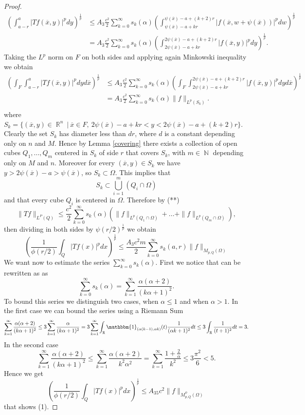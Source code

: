 \documentclass[12pt]{article}
\theoremstyle{definition}
\DeclareMathOperator\rr{\mathbb{R}}
\DeclareMathOperator\nn{\mathbb{N}}
\begin{document}
\begin{proof}
\begin{align*}
 \left(\int_{a-r}^{a}|Tf(\overline x,y)|^p dy\right)^{\frac{1}{p}} &\le A_3\frac{c^2}{2} \sum_{k=0}^\infty s_k(\alpha) \left ( \int_{\psi(\overline x) -a+kr}^{\psi(\overline x) -a+(k+2)r}|f(\overline x, w+\psi(\overline x))|^p  dw \right) ^{\frac{1}{p}} \\
&=A_3\frac{c^2}{2} \sum_{k=0}^\infty s_k(\alpha) \left ( \int_{2\psi(\overline x) -a+kr}^{2\psi(\overline x) -a+(k+2)r}|f(\overline x, y)|^p  dy \right) ^{\frac{1}{p}}.
\end{align*}
Taking the $L^p$ norm on $F$ on both sides and applying again Minkowski inequality we obtain
\begin{align*}
\left(\int_F\int_{a-r}^{a}|Tf(\overline x,y)|^p dy d\overline x\right)^{\frac{1}{p}} &\le A_3 \frac{c^2}{2} \sum_{k=0}^\infty s_k(\alpha) \left (\int_F \int_{2\psi(\overline x) -a+kr}^{2\psi(\overline x) -a+(k+2)r}|f(\overline x, y)|^p  dy d\overline x\right) ^{\frac{1}{p}}\\
&=A_3 \frac{c^2}{2} \sum_{k=0}^\infty s_k(\alpha) \|f\|_{L^p(S_k)}. \tag{**}\\
\end{align*}
where $S_k=\{ (\overline x, y) \in \rr^n \ | \ \overline x \in F ,\  2\psi(\overline x) -a+kr < y < 2\psi(\overline x) -a+(k+2)r \}$. Clearly the set $S_k$ has diameter less than $dr$, where $d$ is a constant depending only on $n$ and $M$. Hence by Lemma \ref{covering} there exists a collection of open cubes $Q_1,...,Q_m$ centered in $S_k$ of side $r$ that covers $S_k$, with $m \in \nn$ depending only on $M$ and $n$. Moreover for every $(\overline x, y ) \in S_k$ we have $y>2\psi(\overline x)-a>\psi(\overline x)$, so $S_k \subset \Omega$. This implies that
\[ S_k \subset \bigcup_{i=1}^m (Q_i\cap \Omega) \]
and that every cube $Q_i$ is centered in $\Omega.$ Therefore by (**) 
\[ \| Tf\|_{L^P(Q)} \le \frac{c^2}{2}\sum_{k=0}^\infty s_k(\alpha) (\|f\|_{L^p(Q_1\cap \Omega)}+...+\|f\|_{L^p(Q_m\cap \Omega)}),\]
 then dividing in both sides by $\psi(r/2)^{\frac{1}{p}}$ we obtain
\[\left(\frac{1}{\phi(r/2)}\int_Q|Tf(x)|^p dx\right)^{\frac{1}{p}} \le \frac{A_3c^2m}{2} \sum_{k=0}^\infty s_k(a,r) \| f\|_{M_{p,Q}(\Omega)} \]
We want now to estimate the series $\sum_{k=0}^\infty s_k(\alpha)$. First we notice that can be rewritten as as
\[\sum_{k=0}^\infty s_k(\alpha)= \sum_{k=1}^\infty \frac{\alpha(\alpha+2)}{(k\alpha+1)^2}.\]
To bound this series we distinguish two cases, when $\alpha\le 1$ and when $\alpha>1$. In the first case we can bound the series using a Riemann Sum
\[ \sum_{k=1}^\infty \frac{\alpha(\alpha+2)}{(k\alpha+1)^2} \le 3\sum_{k=1}^\infty \frac{\alpha}{(k\alpha+1)^2}=3\sum_{k=1}^\infty \int_{\rr} \mathbbm{1}_{(\alpha (k-1), \alpha k)}(t) \frac{1}{(\alpha k+1)^2}dt \le 3\int_{\rr}\frac{1}{(t+1)^2}dt=3. \]
In the second case
\[  \sum_{k=1}^\infty \frac{\alpha(\alpha+2)}{(k\alpha+1)^2}  \le \sum_{k=1}^\infty \frac{\alpha(\alpha+2)}{k^2\alpha^2}=\sum_{k=1}^\infty \frac{1+\frac{2}{\alpha}}{k^2} \le 3 \frac{\pi^2}{6}<5.\]
Hence we get 
\[\left(\frac{1}{\phi(r/2)}\int_Q|Tf(x)|^p dx\right)^{\frac{1}{p}} \le A_35c^2 \| f\|_{M_{p,Q}^\phi(\Omega)} \]
that shows (1). 


\end{proof}
\end{document}
